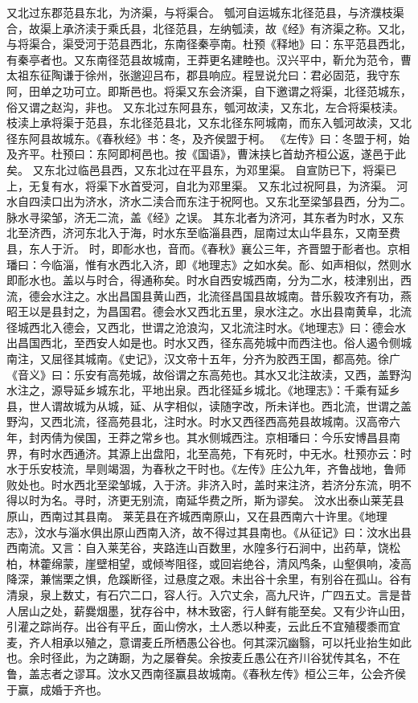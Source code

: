 \documentclass[12pt,UTF8]{ctexbook}
\begin{document}
又北过东郡范县东北，为济渠，与将渠合。
瓠河自运城东北径范县，与济濮枝渠合，故渠上承济渎于乘氏县，北径范县，左纳瓠渎，故《经》有济渠之称。又北，与将渠合，渠受河于范县西北，东南径秦亭南。杜预《释地》曰：东平范县西北，有秦亭者也。又东南径范县故城南，王莽更名建睦也。汉兴平中，靳允为范令，曹太祖东征陶谦于徐州，张邈迎吕布，郡县响应。程昱说允曰：君必固范，我守东阿，田单之功可立。即斯邑也。将渠又东会济渠，自下邀谓之将渠，北径范城东，俗又谓之赵沟，非也。
又东北过东阿县东，瓠河故渎，又东北，左合将渠枝渎。枝渎上承将渠于范县，东北径范县北，又东北径东阿城南，而东入瓠河故渎，又北径东阿县故城东。《春秋经》书：冬，及齐侯盟于柯。
《左传》曰：冬盟于柯，始及齐平。杜预曰：东阿即柯邑也。按《国语》，曹沫挟匕首劫齐桓公返，遂邑于此矣。
又东北过临邑县西，又东北过在平县东，为邓里渠。
自宣防已下，将渠已上，无复有水，将渠下水首受河，自北为邓里渠。
又东北过祝阿县，为济渠。
河水自四渎口出为济水，济水二渎合而东注于祝阿也。又东北至梁邹县西，分为二。
脉水寻梁邹，济无二流，盖《经》之误。
其东北者为济河，其东者为时水，又东北至济西，济河东北入于海，时水东至临淄县西，屈南过太山华县东，又南至费县，东人于沂。
时，即耏水也，音而。《春秋》襄公三年，齐晋盟于耏者也。京相璠曰：今临淄，惟有水西北入济，即《地理志》之如水矣。耏、如声相似，然则水即耏水也。盖以与时合，得通称矣。时水自西安城西南，分为二水，枝津别出，西流，德会水注之。水出昌国县黄山西，北流径昌国县故城南。昔乐毅攻齐有功，燕昭王以是县封之，为昌国君。德会水又西北五里，泉水注之。水出县南黄阜，北流径城西北入德会，又西北，世谓之沧浪沟，又北流注时水。《地理志》曰：德会水出昌国西北，至西安人如是也。时水又西，径东高苑城中而西注也。俗人遏令侧城南注，又屈径其城南。《史记》，汉文帝十五年，分齐为胶西王国，都高苑。徐广《音义》曰：乐安有高苑城，故俗谓之东高苑也。其水又北注故渎，又西，盖野沟水注之，源导延乡城东北，平地出泉。西北径延乡城北。《地理志》：千乘有延乡县，世人谓故城为从城，延、从字相似，读随字改，所未详也。西北流，世谓之盖野沟，又西北流，径高苑县北，注时水。时水又西径西高苑县故城南。汉高帝六年，封丙倩为侯国，王莽之常乡也。其水侧城西注。京相璠曰：今乐安博昌县南界，有时水西通济。其源上出盘阳，北至高苑，下有死时，中无水。杜预亦云：时水于乐安枝流，旱则竭涸，为春秋之干时也。《左传》庄公九年，齐鲁战地，鲁师败处也。时水西北至梁邹城，入于济。非济入时，盖时来注济，若济分东流，明不得以时为名。寻时，济更无别流，南延华费之所，斯为谬矣。
汶水出泰山莱芜县原山，西南过其县南。
莱芜县在齐城西南原山，又在县西南六十许里。《地理志》，汶水与淄水俱出原山西南入济，故不得过其县南也。《从征记》曰：汶水出县西南流。又言：自入莱芜谷，夹路连山百数里，水隍多行石涧中，出药草，饶松柏，林藿绵蒙，崖壁相望，或倾岑阻径，或回岩绝谷，清风鸤条，山壑俱响，凌高降深，兼惴栗之惧，危蹊断径，过悬度之艰。未出谷十余里，有别谷在孤山。谷有清泉，泉上数丈，有石穴二口，容人行。入穴丈余，高九尺许，广四五丈。言是昔人居山之处，薪爨烟墨，犹存谷中，林木致密，行人鲜有能至矣。又有少许山田，引灌之踪尚存。出谷有平丘，面山傍水，土人悉以种麦，云此丘不宜殖稷黍而宜麦，齐人相承以殖之，意谓麦丘所栖愚公谷也。何其深沉幽翳，可以托业抬生如此也。余时径此，为之踌蹰，为之屡眷矣。余按麦丘愚公在齐川谷犹传其名，不在鲁，盖志者之谬耳。汶水又西南径赢县故城南。《春秋左传》桓公三年，公会齐侯于赢，成婚于齐也。
\end{document}
